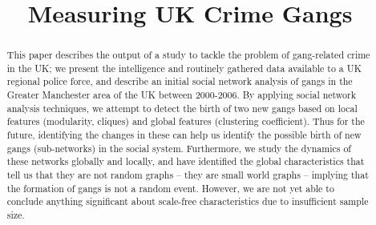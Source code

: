 \documentclass[conference]{IEEEtran}
\theoremstyle{definition}
\begin{document}
%
\title{Measuring UK Crime Gangs}

\author{
\and
{}
}





\maketitle


\begin{abstract}
This paper describes the output of a study to tackle the problem of
gang-related crime in the UK; we present the intelligence and
routinely gathered data available to a UK regional police force, and
describe an initial social network analysis of gangs in the Greater
Manchester area of the UK between 2000-2006. By applying social
network analysis techniques, we attempt to detect the birth of two new
gangs based on local features (modularity, cliques) and global
features (clustering coefficient). Thus for the future, identifying
the changes in these can help us identify the possible birth of new
gangs (sub-networks) in the social system. Furthermore, we study the
dynamics of these networks globally and locally, and have identified
the global characteristics that tell us that they are not random
graphs -- they are small world graphs -- implying that the formation
of gangs is not a random event. However, we are not yet able to
conclude anything significant about scale-free characteristics due to
insufficient sample size.
\end{abstract}
\end{document}
